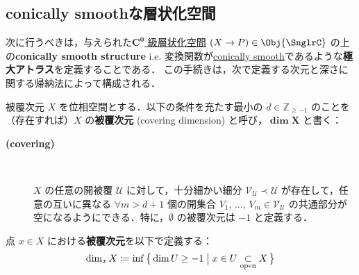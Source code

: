 \documentclass[TQFT_main]{subfiles}
\begin{document}
\subsection{conically smoothな層状化空間}

次に行うべきは，与えられた\hyperref[def:Snglr-C0]{$\bm{C^0}$ 級層状化空間} $(X \to P) \in \Obj{\SnglrC}$ の上の\textbf{conically smooth structure} i.e. 変換関数が\hyperref[def:c-smooth-along]{conically smooth}であるような\textbf{極大アトラス}を定義することである．
この手続きは，次で定義する次元と深さに関する帰納法によって構成される．

\begin{mydef}[label=def:covering-dim]{被覆次元}
    $X$ を位相空間とする．以下の条件を充たす最小の $d \in \mathbb{Z}_{\ge -1}$ のことを（存在すれば）$X$ の\textbf{被覆次元} (covering dimension) と呼び，$\bm{\dim X}$ と書く：
    
    \begin{description}
        \item[\textbf{(covering)}]　
        
        $X$ の任意の開被覆 $\mathscr{U}$ に対して，十分細かい細分 $\mathscr{V}_{\mathscr{U}} \prec \mathscr{U}$ が存在して，任意の互いに異なる $\forall m > d+1$ 個の開集合 $V_1,\, \dots,\, V_{m} \in \mathscr{V}_{\mathscr{U}}$ の共通部分が空になるようにできる．特に，$\emptyset$ の被覆次元は $-1$ と定義する．
    \end{description}
    
    \tcblower

    点 $x \in X$ における\textbf{被覆次元}を以下で定義する：
    \begin{align}
        \dim_x X \coloneqq \inf\, \bigl\{\, \dim U \ge -1 \bigm| x \in U \underset{\text{open}}{\subset} X \,\bigr\}
    \end{align}
\end{mydef}
\end{document}
